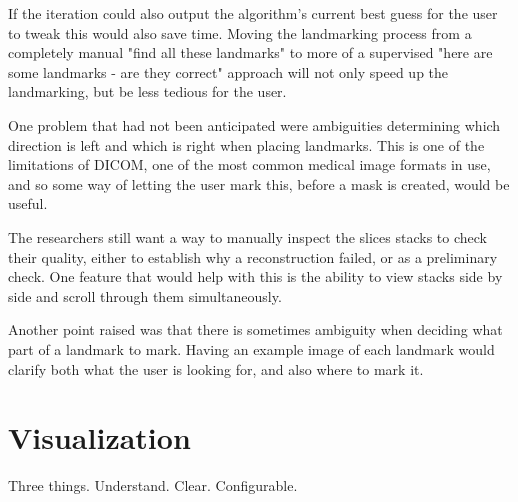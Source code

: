 If the iteration could also output the algorithm's current best guess for the user to tweak this would also save time. Moving the landmarking process from a completely manual "find all these landmarks" to more of a supervised "here are some landmarks - are they correct" approach will not only speed up the landmarking, but be less tedious for the user.

One problem that had not been anticipated were ambiguities determining which direction is left and which is right when placing landmarks. This is one of the limitations of DICOM, one of the most common medical image formats in use, and so some way of letting the user mark this, before a mask is created, would be useful.

The researchers still want a way to manually inspect the slices stacks to check their quality, either to establish why a reconstruction failed, or as a preliminary check. One feature that would help with this is the ability to view stacks side by side and scroll through them simultaneously.

Another point raised was that there is sometimes ambiguity when deciding what part of a landmark to mark. Having an example image of each landmark would clarify both what the user is looking for, and also where to mark it.

\newpage
\section{Visualization}
Three things. Understand. Clear. Configurable.

